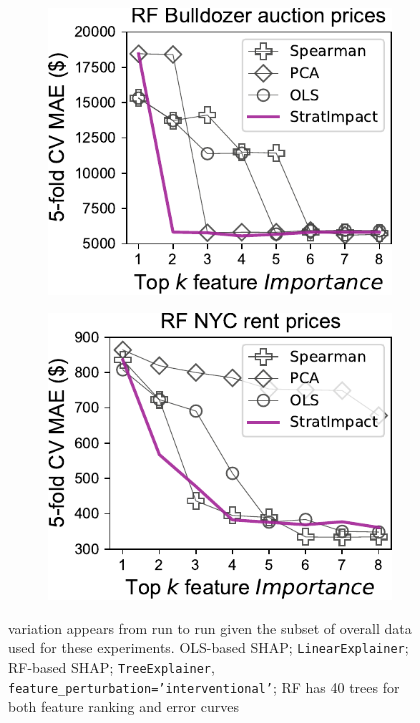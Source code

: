 \documentclass[11pt]{article}
\begin{document}
\begin{figure}
\begin{subfigure}{.245\textwidth}
    \centering
\includegraphics[scale=0.45]{images/bulldozer-topk-baseline-Importance.pdf}
\end{subfigure}
\begin{subfigure}{.245\textwidth}
    \centering
\includegraphics[scale=0.45]{images/rent-topk-baseline-Importance.pdf}
\end{subfigure} 
\caption{\small variation appears from run to run given the subset of overall data used for these experiments. OLS-based SHAP; {\tt\small LinearExplainer}; RF-based SHAP; {\tt\small TreeExplainer}, {\tt\small feature\_perturbation='interventional'}; RF has 40 trees for both feature ranking and error curves}
\label{fig:baseline}
\end{figure}
\end{document}
